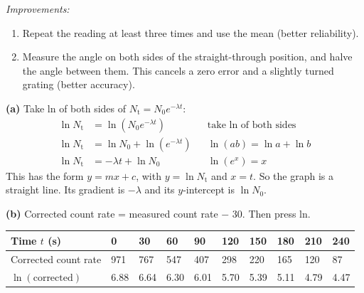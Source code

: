 \begin{practiceanswers}
\begin{practiceans}
\begin{modelanswer}
  \emph{Improvements:}
  \begin{enumerate}
    \item Repeat the reading at least three times and use the mean (better reliability).
    \item Measure the angle on both sides of the straight-through position, and halve the
          angle between them. This cancels a zero error and a slightly turned grating (better
          accuracy).
  \end{enumerate}
  \end{modelanswer}
  \begin{markingcriteria}
  \end{markingcriteria}
\end{practiceans}

\begin{practiceans}
  \textbf{(a)} Take ln of both sides of $N_\mathrm{t} = N_0 e^{-\lambda t}$:
  \begin{align*}
    \ln N_\mathrm{t} &= \ln\left(N_0 e^{-\lambda t}\right) && \text{take ln of both sides}\\
    \ln N_\mathrm{t} &= \ln N_0 + \ln\left(e^{-\lambda t}\right) && \text{$\ln(ab) = \ln a + \ln b$}\\
    \ln N_\mathrm{t} &= -\lambda t + \ln N_0 && \text{$\ln(e^{x}) = x$}
  \end{align*}
  This has the form $y = mx + c$, with $y = \ln N_\mathrm{t}$ and $x = t$. So the graph is a
  straight line. Its gradient is $-\lambda$ and its $y$-intercept is $\ln N_0$.

  \textbf{(b)} Corrected count rate = measured count rate $-$ 30. Then press ln.
  \begin{center}\small\setlength\tabcolsep{4pt}
  \begin{tabular}{@{}L{36mm}*{9}{C{8.5mm}}@{}}
    \toprule
    Time $t$ (\si{s}) & 0 & 30 & 60 & 90 & 120 & 150 & 180 & 210 & 240\\
    \midrule
    Corrected count rate & 971 & 767 & 547 & 407 & 298 & 220 & 165 & 120 & 87\\
    \midrule
    $\ln(\text{corrected})$ & 6.88 & 6.64 & 6.30 & 6.01 & 5.70 & 5.39 & 5.11 & 4.79 & 4.47\\
    \bottomrule
  \end{tabular}
  \end{center}


\end{practiceans}
\end{practiceanswers}

